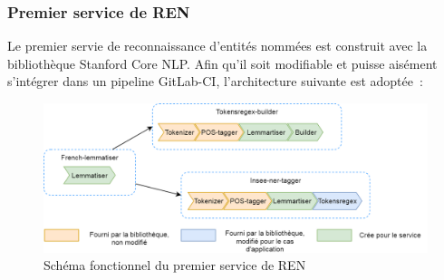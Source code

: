 \subsubsection{Premier service de REN}
Le premier servie de reconnaissance d'entités nommées est construit avec la bibliothèque Stanford Core NLP. Afin qu'il soit modifiable et puisse aisément s'intégrer dans un pipeline GitLab-CI, l'architecture suivante est adoptée~:

\begin{figure}[H]
    \centering
    \includegraphics[scale=0.38]{images/Concept-tagger.png}
    \caption{Schéma fonctionnel du premier service de REN}
    \label{fig:premier-pipeline}
\end{figure}
\vspace{10pt}

